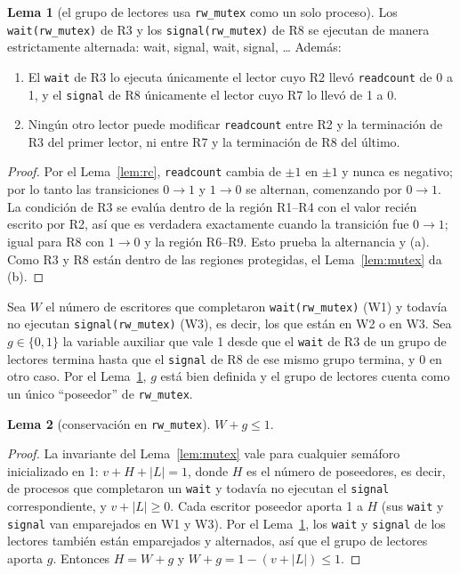 \documentclass[12pt,letterpaper]{article}
\theoremstyle{definition}
\newtheorem{lema}{Lema}
\newcommand{\sem}[1]{\texttt{#1}}
\begin{document}
\begin{lema}[el grupo de lectores usa \sem{rw\_mutex} como un solo proceso]\label{lem:grupo}
Los \sem{wait(rw\_mutex)} de R3 y los \sem{signal(rw\_mutex)} de R8 se ejecutan de manera estrictamente alternada: wait, signal, wait, signal, \ldots{} Además:
\begin{enumerate}[label=(\alph*),itemsep=2pt]
\item El \sem{wait} de R3 lo ejecuta únicamente el lector cuyo R2 llevó \sem{readcount} de 0 a 1, y el \sem{signal} de R8 únicamente el lector cuyo R7 lo llevó de 1 a 0.
\item Ningún otro lector puede modificar \sem{readcount} entre R2 y la terminación de R3 del primer lector, ni entre R7 y la terminación de R8 del último.
\end{enumerate}
\end{lema}
\begin{proof}
Por el Lema~\ref{lem:rc}, \sem{readcount} cambia de $\pm 1$ en $\pm 1$ y nunca es negativo; por lo tanto las transiciones $0\to1$ y $1\to0$ se alternan, comenzando por $0\to1$. La condición de R3 se evalúa dentro de la región R1--R4 con el valor recién escrito por R2, así que es verdadera exactamente cuando la transición fue $0\to 1$; igual para R8 con $1 \to 0$ y la región R6--R9. Esto prueba la alternancia y (a). Como R3 y R8 están dentro de las regiones protegidas, el Lema~\ref{lem:mutex} da (b).
\end{proof}

Sea $W$ el número de escritores que completaron \sem{wait(rw\_mutex)} (W1) y todavía no ejecutan \sem{signal(rw\_mutex)} (W3), es decir, los que están en W2 o en W3. Sea $g\in\{0,1\}$ la variable auxiliar que vale 1 desde que el \sem{wait} de R3 de un grupo de lectores termina hasta que el \sem{signal} de R8 de ese mismo grupo termina, y 0 en otro caso. Por el Lema~\ref{lem:grupo}, $g$ está bien definida y el grupo de lectores cuenta como un único ``poseedor'' de \sem{rw\_mutex}.

\begin{lema}[conservación en \sem{rw\_mutex}]\label{lem:rw}
$W + g \le 1$.
\end{lema}
\begin{proof}
La invariante del Lema~\ref{lem:mutex} vale para cualquier semáforo inicializado en 1: $v + H + |L| = 1$, donde $H$ es el número de poseedores, es decir, de procesos que completaron un \sem{wait} y todavía no ejecutan el \sem{signal} correspondiente, y $v+|L|\ge 0$. Cada escritor poseedor aporta 1 a $H$ (sus \sem{wait} y \sem{signal} van emparejados en W1 y W3). Por el Lema~\ref{lem:grupo}, los \sem{wait} y \sem{signal} de los lectores también están emparejados y alternados, así que el grupo de lectores aporta $g$. Entonces $H = W + g$ y $W + g = 1 - (v + |L|) \le 1$.
\end{proof}
\end{document}
